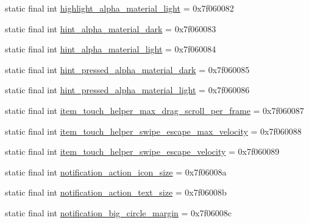 \begin{DoxyCompactItemize}
\item 
static final int \mbox{\hyperlink{classandroid_1_1support_1_1design_1_1R_1_1dimen_aae4ec3504ac5846750b92f88579b6046}{highlight\+\_\+alpha\+\_\+material\+\_\+light}} = 0x7f060082
\item 
static final int \mbox{\hyperlink{classandroid_1_1support_1_1design_1_1R_1_1dimen_a3c8e6eb51f33da6ddecd401f27c47851}{hint\+\_\+alpha\+\_\+material\+\_\+dark}} = 0x7f060083
\item 
static final int \mbox{\hyperlink{classandroid_1_1support_1_1design_1_1R_1_1dimen_a01962e08f9693c909a011603ef73626d}{hint\+\_\+alpha\+\_\+material\+\_\+light}} = 0x7f060084
\item 
static final int \mbox{\hyperlink{classandroid_1_1support_1_1design_1_1R_1_1dimen_a20b76581b6de81f2298cac2ceef69fcc}{hint\+\_\+pressed\+\_\+alpha\+\_\+material\+\_\+dark}} = 0x7f060085
\item 
static final int \mbox{\hyperlink{classandroid_1_1support_1_1design_1_1R_1_1dimen_a5df49e66c28b7f17675b0bee01c72283}{hint\+\_\+pressed\+\_\+alpha\+\_\+material\+\_\+light}} = 0x7f060086
\item 
static final int \mbox{\hyperlink{classandroid_1_1support_1_1design_1_1R_1_1dimen_a07d36d69ceb0dc4c277609d12fdb5bd4}{item\+\_\+touch\+\_\+helper\+\_\+max\+\_\+drag\+\_\+scroll\+\_\+per\+\_\+frame}} = 0x7f060087
\item 
static final int \mbox{\hyperlink{classandroid_1_1support_1_1design_1_1R_1_1dimen_a3495a45fed6b52fc4ed5416ef815b40d}{item\+\_\+touch\+\_\+helper\+\_\+swipe\+\_\+escape\+\_\+max\+\_\+velocity}} = 0x7f060088
\item 
static final int \mbox{\hyperlink{classandroid_1_1support_1_1design_1_1R_1_1dimen_a34ee6f178bf059b46f46260979a7bd13}{item\+\_\+touch\+\_\+helper\+\_\+swipe\+\_\+escape\+\_\+velocity}} = 0x7f060089
\item 
static final int \mbox{\hyperlink{classandroid_1_1support_1_1design_1_1R_1_1dimen_adc30f18b674ab0f94e86853295177a34}{notification\+\_\+action\+\_\+icon\+\_\+size}} = 0x7f06008a
\item 
static final int \mbox{\hyperlink{classandroid_1_1support_1_1design_1_1R_1_1dimen_ae5ee57e8062ed319c805707a3c052700}{notification\+\_\+action\+\_\+text\+\_\+size}} = 0x7f06008b
\item 
static final int \mbox{\hyperlink{classandroid_1_1support_1_1design_1_1R_1_1dimen_a738d4a2e02666e88d0598455b8b03155}{notification\+\_\+big\+\_\+circle\+\_\+margin}} = 0x7f06008c
\item 

\end{DoxyCompactItemize}
